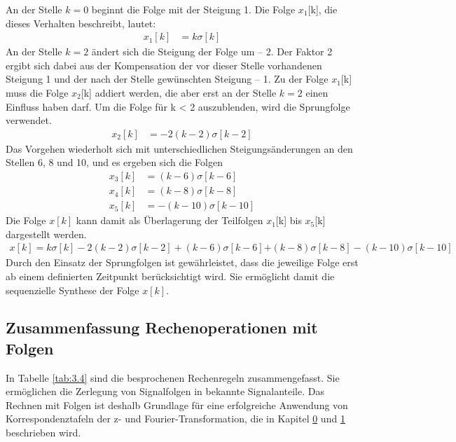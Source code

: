 An der Stelle \(k = 0\) beginnt die Folge mit der Steigung 1. Die Folge \(x_{1}\){[}k{]}, die dieses Verhalten beschreibt, lautet:
\begin{align}
x_{1}[ k] &= k  \sigma[ k] \label{eq:3.43}
\end{align}
An der Stelle \(k = 2\) ändert sich die Steigung der Folge um -- 2. Der Faktor 2 ergibt sich dabei aus der Kompensation der vor dieser Stelle vorhandenen Steigung 1 und der nach der Stelle gewünschten Steigung -- 1. Zu der Folge \(x_{1}\){[}k{]} muss die Folge \(x_{2}\){[}k{]} addiert werden, die aber erst an der Stelle \(k = 2\) einen Einfluss haben darf. Um die Folge für k \textless{} 2 auszublenden, wird die Sprungfolge verwendet.
\begin{align}
x_{2}[ k] &= - 2  (k - 2)  \sigma[ k - 2] \label{eq:3.44}
\end{align}
Das Vorgehen wiederholt sich mit unterschiedlichen Steigungsänderungen an den Stellen 6, 8 und 10, und es ergeben sich die Folgen
\begin{align}
x_{3}[ k] &= (k - 6)  \sigma[ k - 6] \label{eq:3.45} \\
x_{4}[ k] &= (k - 8)  \sigma[ k - 8] \label{eq:3.46} \\
x_{5}[ k] &= - (k - 10)  \sigma[ k - 10] \label{eq:3.47}
\end{align}
Die Folge \(x[k]\) kann damit als Überlagerung der Teilfolgen \(x_{1}\){[}k{]} bis \(x_{5}\){[}k{]} dargestellt werden.
\begin{align}
{x[ k] = k  \sigma[ k] - 2  (k - 2)  \sigma[ k - 2] + (k - 6)  \sigma[ k - 6]
}{+ (k - 8)  \sigma[ k - 8] - (k - 10)  \sigma[ k - 10]} \label{eq:3.48}
\end{align}
Durch den Einsatz der Sprungfolgen ist gewährleistet, dass die jeweilige Folge erst ab einem definierten Zeitpunkt berücksichtigt wird. Sie ermöglicht damit die sequenzielle Synthese der Folge \(x[k]\).

\subsection{Zusammenfassung Rechenoperationen mit Folgen}\label{sec:zusammenfassung-rechenoperationen-mit-folgen}

In Tabelle \ref{tab:3.4} sind die besprochenen Rechenregeln zusammengefasst. Sie ermöglichen die Zerlegung von Signalfolgen in bekannte Signalanteile. Das Rechnen mit Folgen ist deshalb Grundlage für eine erfolgreiche Anwendung von Korrespondenztafeln der z- und Fourier-Transformation, die in Kapitel \hyperref[_Toc177369030]{0} und \hyperref[section]{1} beschrieben wird.

